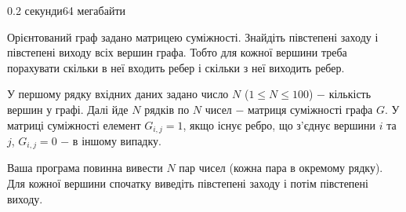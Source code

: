 \begin{problem}{}{}{}{0.2 секунди}{64 мегабайти}

Орієнтований граф задано матрицею суміжності. Знайдіть півстепені заходу і півстепені виходу всіх вершин графа.
Тобто для кожної вершини треба порахувати скільки в неї входить ребер і скільки з неї виходить ребер.

\InputFile
У першому рядку вхідних даних задано число $N$ ($1 \le N \le 100$) $-$ кількість вершин у графі.
Далі йде $N$ рядків по $N$ чисел $-$ матриця суміжності графа $G$. У матриці суміжності елемент $G_{i,j}=1$, якщо
існує ребро, що з'єднує вершини $i$ та $j$, $G_{i,j}=0$ $-$ в іншому випадку.

\OutputFile
Ваша програма повинна вивести $N$ пар чисел (кожна пара в окремому рядку). Для кожної вершини спочатку виведіть 
півстепені заходу і потім півстепені виходу.

\Example

\begin{example}
%
\end{example}

\end{problem}


